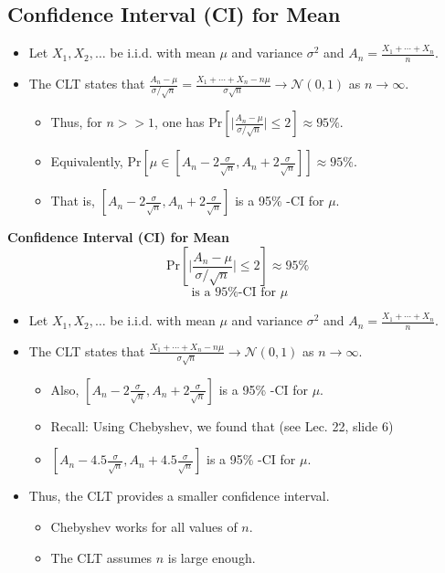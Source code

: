 \documentclass{article}
\newcommand{\pr}[1]{\textrm{Pr}[#1]}
\newcommand{\xs}[1]{\textrm{ #1 }}
\newcommand{\eq}[1]{\begin{equation}#1\end{equation}}
\newcommand{\eqs}[1]{\begin{mdframed}#1\end{mdframed}}
\providecommand{\abs}[1]{\lvert#1\rvert} \providecommand{\norm}[1]{\lVert#1\rVert}
\newcommand{\items}[1]{\begin{itemize}#1\end{itemize}}
\newcommand{\ninfty}{n\rightarrow\infty}
\newcommand{\cur}{\mathscr}
\begin{document}
\subsection*{Confidence Interval (CI) for Mean}
\items {
    \item Let $X_1,X_2,\ldots$ be i.i.d. with mean $\mu$ and variance $\sigma^2$ and $A_n =\frac{X_1 +\cdots+X_n}{n}$.
    \item The CLT states that $\frac{A_n - \mu}{\sigma/\sqrt{n}}=\frac{X_1 +\cdots+X_n -n\mu}{\sigma\sqrt{n}}\rightarrow\cur{N}(0,1)$ as $\ninfty$.
    \items {
        \item Thus, for $n >> 1$, one has $\pr{\abs{\frac{A_n-\mu}{\sigma/\sqrt{n}}} \le 2} \approx 95\%$.
        \item Equivalently, $\pr{\mu \in [A_n-2\frac{\sigma}{\sqrt{n}},A_n+2\frac{\sigma}{\sqrt{n}}]} \approx 95\%$.
        \item That is, $[A_n-2\frac{\sigma}{\sqrt{n}},A_n+2\frac{\sigma}{\sqrt{n}}]$ is a 95\% -CI for $\mu$.
    }
}
\eqs{
\textbf{Confidence Interval (CI) for Mean}
\eq{\pr{\abs{\frac{A_n-\mu}{\sigma/\sqrt{n}}} \le 2} \approx 95\%}
\eq{[A_n-2\frac{\sigma}{\sqrt{n}},A_n+2\frac{\sigma}{\sqrt{n}}] \xs{is a 95\% -CI for} \mu}
}
\items {
    \item Let $X_1,X_2,\ldots$ be i.i.d. with mean $\mu$ and variance $\sigma^2$ and $A_n = \frac{X_1 +\cdots+X_n}{n}$.
    \item The CLT states that $\frac{X_1 +\cdots+X_n -n\mu}{\sigma\sqrt{n}}\rightarrow\cur{N}(0,1)$ as $\ninfty$.
    \items {
        \item Also, $[A_n-2\frac{\sigma}{\sqrt{n}},A_n+2\frac{\sigma}{\sqrt{n}}]$ is a 95\% -CI for $\mu$.
        \item Recall: Using Chebyshev, we found that (see Lec. 22, slide 6)
        \item $[A_n-4.5\frac{\sigma}{\sqrt{n}},A_n+4.5\frac{\sigma}{\sqrt{n}}]$ is a 95\% -CI for $\mu$.
        }
    \item Thus, the CLT provides a smaller confidence interval.
    \items {
        \item Chebyshev works for all values of $n$.
        \item The CLT assumes $n$ is large enough.
    }
}
\end{document}

